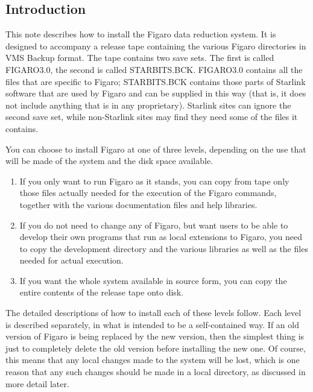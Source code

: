 \subsection{Introduction}

This note describes how to install the Figaro data reduction system. It is
designed to accompany a release tape containing the various Figaro directories
in VMS Backup format. The tape contains two save sets. The first is called
FIGARO3.0, the second is called STARBITS.BCK. FIGARO3.0 contains all the files
that are specific to Figaro; STARBITS.BCK contains those parts of Starlink
software that are used by Figaro and can be supplied in this way (that is, it
does not include anything that is in any proprietary). Starlink sites can
ignore the second save set, while non-Starlink sites may find they need some
of the files it contains.

You can choose to install Figaro at one of three levels, depending on the use
that will be made of the system and the disk space available.

\begin{enumerate}

\item If you only want to run Figaro as it stands, you can copy from tape
only those files actually needed for the execution of the Figaro commands,
together with the various documentation files and help libraries.

\item If you do not need to change any of Figaro, but want users to be able to
develop their own programs that run as local extensions to Figaro, you need to
copy the development directory and the various libraries as well as the files
needed for actual execution.

\item If you want the whole system available in source form, you can copy the
entire contents of the release tape onto disk.
\end{enumerate}

The detailed descriptions of how to install each of these levels follow. Each
level is described separately, in what is intended to be a self-contained way.
If an old version of Figaro is being replaced by the new version, then the
simplest thing is just to completely delete the old version before installing
the new one. Of course, this means that any local changes made to the system
will be lost, which is one reason that any such changes should be made in a
local directory, as discussed in more detail later.


